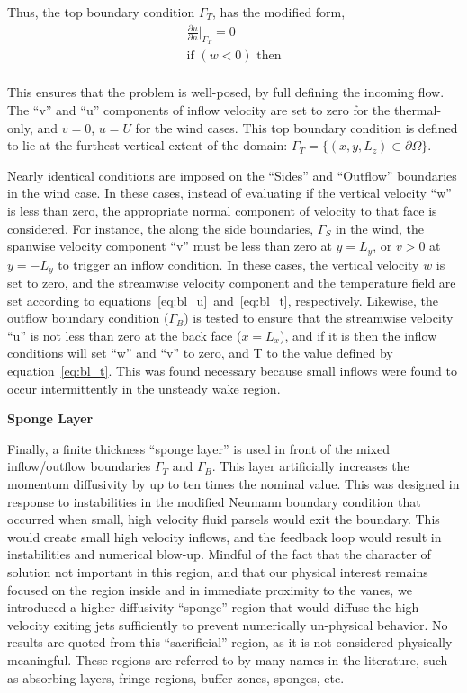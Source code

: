 Thus, the top boundary condition $\Gamma_T$, has the modified form, 
\begin{align}
  \frac{\partial u}{\partial n}\bigg|_{\Gamma_T} = 0 \\
  \text{if }(w<0) \text{ then} \\
  
\end{align}

This ensures that the problem is well-posed, by full defining the incoming flow. 
The ``v'' and ``u'' components of inflow velocity are set to zero for the thermal-only, and $v=0$, 
$u=U$ for the wind cases. This top boundary condition is defined to lie at the furthest 
vertical extent of the domain: $\Gamma_T = \{(x,y,L_z) \subset \partial \Omega \} $. 

Nearly identical conditions are imposed on the ``Sides'' and ``Outflow'' 
boundaries in the wind case. 
In these cases, instead of evaluating if the vertical velocity ``w'' is less than zero, 
the appropriate normal component of velocity to that face is considered. For instance, the 
along the side boundaries, $\Gamma_S$ in the wind, the spanwise velocity component ``v'' 
must be less than zero at $y=L_y$, or $v>0$ at $y=-L_y$ to trigger an inflow condition. 
In these cases, the vertical velocity $w$ is set to zero, and the streamwise velocity component and
the temperature field are set according to equations~\ref{eq:bl_u}~and~\ref{eq:bl_t}, respectively.
Likewise, the outflow boundary condition ($\Gamma_B$) is tested to ensure that the streamwise 
velocity ``u'' is not less than zero at the back face ($x=L_x$), and if it is then the inflow 
conditions will set ``w'' and ``v'' to zero, and T to the value defined by equation~\ref{eq:bl_t}.
This was found necessary because small inflows were found to occur intermittently 
in the unsteady wake region. 

\textbf{Sponge Layer} 

Finally, a finite thickness ``sponge layer'' is used in front of the
mixed inflow/outflow boundaries $\Gamma_T$ and $\Gamma_B$.
This layer artificially increases the momentum diffusivity by
up to ten times the nominal value. This was designed in response to
instabilities in the modified Neumann boundary condition that occurred
when small, high velocity fluid parsels would exit the boundary. This
would create small high velocity inflows, and the feedback loop would
result in instabilities and numerical blow-up. Mindful of the fact that
the character of solution not important in this region, and that our
physical interest remains focused on the region inside and in immediate
proximity to the vanes, we introduced a higher diffusivity ``sponge''
region that would diffuse the high velocity exiting jets sufficiently to
prevent numerically un-physical behavior. No results are quoted from
this ``sacrificial'' region, as it is not considered physically
meaningful. These regions are referred to by many names in the
literature\cite{doi:10.1146/annurev.fluid.36.050802.121930}, such as
absorbing layers, fringe regions, buffer zones, sponges, etc. 


